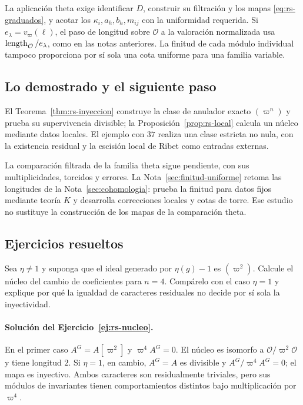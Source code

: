 La aplicación theta exige identificar $D$, construir
su filtración y los mapas \eqref{eq:rs-graduados}, y acotar los
$\kappa_i,a_h,b_h,m_{ij}$ con la uniformidad requerida.
Si $e_\lambda=v_\varpi(\ell)$, el paso de longitud sobre
$\mathcal O$ a la valoración normalizada usa
$\operatorname{length}_{\mathcal O}/e_\lambda$, como en las notas anteriores.
La finitud de cada módulo individual tampoco proporciona por
sí sola una cota uniforme para una familia variable.

\subsection{Lo demostrado y el siguiente paso}

El Teorema~\ref{thm:rs-inyeccion} construye la clase de anulador
exacto $(\varpi^n)$ y prueba su supervivencia divisible;
la Proposición~\ref{prop:rs-local} calcula un núcleo mediante
datos locales. El ejemplo con $37$ realiza una clase estricta
no nula, con la existencia residual y la escisión local de Ribet
como entradas externas.

La comparación filtrada de la familia theta sigue pendiente,
con sus multiplicidades, torcidos y errores.
La Nota~\ref{sec:finitud-uniforme} retoma las longitudes de la
Nota~\ref{sec:cohomologia}: prueba la finitud para datos fijos
mediante teoría $K$ y desarrolla correcciones locales y cotas
de torre. Ese estudio no sustituye la construcción de los
mapas de la comparación theta.

\subsection{Ejercicios resueltos}

\begin{ejercicio}\label{ej:rs-nucleo}
Sea $\eta\ne1$ y suponga que el ideal generado por $\eta(g)-1$
es $(\varpi^2)$. Calcule el núcleo del cambio de coeficientes
para $n=4$. Compárelo con el caso $\eta=1$ y explique por qué
la igualdad de caracteres residuales no decide por sí sola
la inyectividad.
\end{ejercicio}

\paragraph{Solución del Ejercicio~\ref{ej:rs-nucleo}.}
En el primer caso $A^G=A[\varpi^2]$ y $\varpi^4A^G=0$.
El núcleo es isomorfo a $\mathcal O/\varpi^2\mathcal O$ y
tiene longitud $2$. Si $\eta=1$, en cambio, $A^G=A$ es
divisible y $A^G/\varpi^4A^G=0$; el mapa es inyectivo.
Ambos caracteres son residualmente triviales, pero sus módulos
de invariantes tienen comportamientos distintos bajo multiplicación
por $\varpi^4$.

